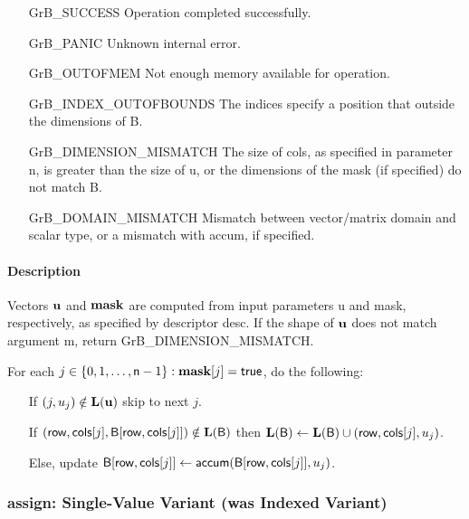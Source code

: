 \begin{itemize}[leftmargin=2.1in]
\item[{\sf GrB\_SUCCESS}]             Operation completed successfully.
\item[{\sf GrB\_PANIC}]               Unknown internal error.
\item[{\sf GrB\_OUTOFMEM}]            Not enough memory available for operation.
\item[{\sf GrB\_INDEX\_OUTOFBOUNDS}]  The indices specify a position that outside the dimensions of {\sf B}.
\item[{\sf GrB\_DIMENSION\_MISMATCH}] 
        The size of {\sf cols}, as specified in parameter {\sf n}, is greater than the size of {\sf u}, or
        the dimensions of the mask (if specified) do not match {\sf B}.
\item[{\sf GrB\_DOMAIN\_MISMATCH}]    Mismatch between vector/matrix domain and scalar type,
                                      or a mismatch with {\sf accum}, if specified.
\end{itemize}

\paragraph{Description}

Vectors ${\bf u}$ and ${\bf mask}$ are computed from input parameters {\sf u} and {\sf mask}, respectively,
as specified by descriptor {\sf desc}. If the shape of ${\bf u}$ does not match argument {\sf m},
return {\sf GrB\_DIMENSION\_MISMATCH}.

For each $j \in \{0, 1, \ldots, {\sf n}-1 \} : {\bf mask}[j] = {\sf true}$, do the following:
\begin{itemize}
	\item[] If $(j,u_{j}) \notin \bold{L}({\bf u})$ skip to next $j$.
	\item[] If $({\sf row}, {\sf cols}[j], {\sf B}[{\sf row},{\sf cols}[j]]) \notin \bold{L}({\sf B})$ then
	      $\bold{L}({\sf B}) \leftarrow \bold{L}({\sf B}) \cup ({\sf row},{\sf cols}[j],u_{j})$.
	\item[]  Else, update ${\sf B}[{\sf row},{\sf cols}[j]] \leftarrow {\sf accum}({\sf B}[{\sf row},{\sf cols}[j]],u_{j})$.
\end{itemize}

\subsubsection{{\sf assign}: Single-Value Variant (was Indexed Variant)}

